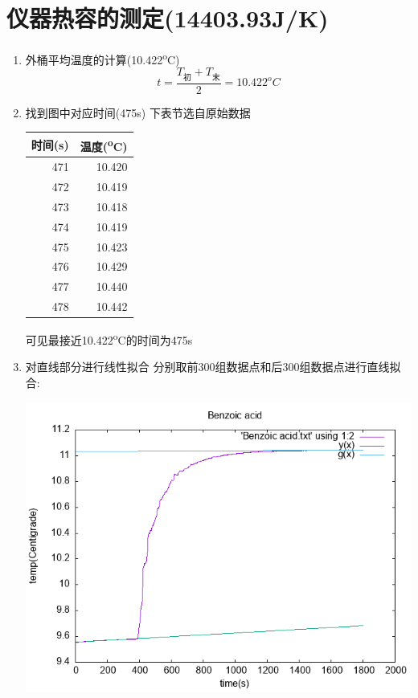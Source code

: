 \documentclass[11pt]{report}
\begin{document}
\section{仪器热容的测定(14403.93J/K)}
\label{sec:org96388b1}
\begin{enumerate}
\item 外桶平均温度的计算(10.422\textsuperscript{o}C)
\label{sec:orgd5211e6}
\[
     t=\frac{T_{初}+T_{末}}{2}=10.422^{o}C
     \]
\item 找到图中对应时间(475s)
\label{sec:orgff745d9}
下表节选自原始数据
\begin{center}
\begin{tabular}{rr}
时间(s) & 温度(\textsuperscript{o}C)\\
\hline
471 & 10.420\\
472 & 10.419\\
473 & 10.418\\
474 & 10.419\\
475 & 10.423\\
476 & 10.429\\
477 & 10.440\\
478 & 10.442\\
\end{tabular}
\end{center}
可见最接近10.422\textsuperscript{o}C的时间为475s
\item 对直线部分进行线性拟合
\label{sec:orgaafce6c}
分别取前300组数据点和后300组数据点进行直线拟合:
\begin{center}
\includegraphics[width=.9\linewidth]{../img/Benzoic acid.png}
\end{center}


\end{enumerate}
\end{document}
